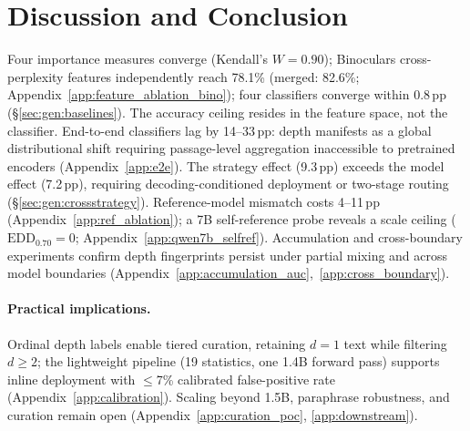 \section{Discussion and Conclusion}
\label{sec:discussion}

Four importance measures converge (Kendall's $W{=}0.90$); Binoculars cross-perplexity features independently reach 78.1\% (merged: 82.6\%; Appendix~\ref{app:feature_ablation_bino}); four classifiers converge within 0.8\,pp (\S\ref{sec:gen:baselines}).
The accuracy ceiling resides in the feature space, not the classifier.
End-to-end classifiers lag by 14--33\,pp: depth manifests as a global distributional shift requiring passage-level aggregation inaccessible to pretrained encoders (Appendix~\ref{app:e2e}).
The strategy effect (9.3\,pp) exceeds the model effect (7.2\,pp), requiring decoding-conditioned deployment or two-stage routing (\S\ref{sec:gen:crossstrategy}).
Reference-model mismatch costs 4--11\,pp (Appendix~\ref{app:ref_ablation}); a 7B self-reference probe reveals a scale ceiling ($\mathrm{EDD}_{0.70}{=}0$; Appendix~\ref{app:qwen7b_selfref}).
Accumulation and cross-boundary experiments confirm depth fingerprints persist under partial mixing and across model boundaries (Appendix~\ref{app:accumulation_auc},~\ref{app:cross_boundary}).

\paragraph{Practical implications.}
Ordinal depth labels enable tiered curation, retaining $d{=}1$ text while filtering $d{\geq}2$; the lightweight pipeline (19 statistics, one 1.4B forward pass) supports inline deployment with ${\leq}$7\% calibrated false-positive rate (Appendix~\ref{app:calibration}). Scaling beyond 1.5B, paraphrase robustness, and curation remain open (Appendix~\ref{app:curation_poc}, \ref{app:downstream}).

